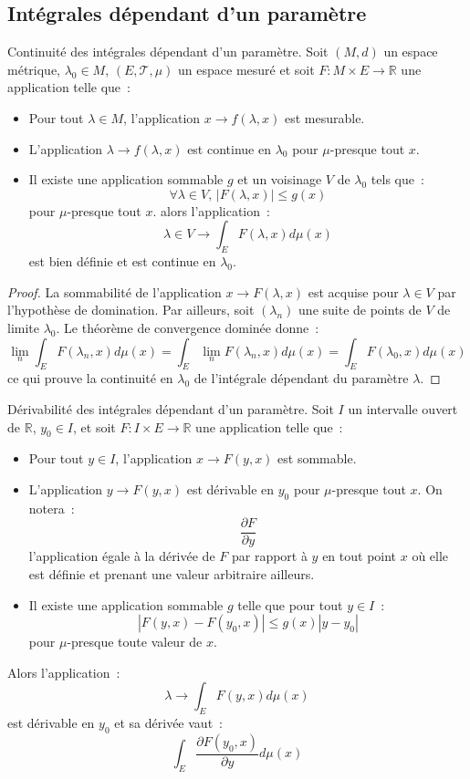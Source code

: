 \subsection{Intégrales dépendant d'un paramètre}
\begin{prop}\label{ch2:contpar} Continuité des intégrales dépendant
  d'un paramètre.
Soit $(M,d)$ un espace métrique, $\lambda_0 \in M$, $(E, \mathcal{T},\mu)$ un espace mesuré et soit $F : M \times E \to
\mathbb{R}$ une application telle que~:
\begin{itemize}
\item Pour tout $\lambda \in M$, l'application $x \to f(\lambda,x)$
  est mesurable.
\item L'application $\lambda \to f(\lambda,x)$ est continue en
  $\lambda_0$ pour $\mu$-presque tout $x$.
\item Il existe une application sommable $g$ et un voisinage $V$ de
  $\lambda_0$ tels que~:
\[
\forall \lambda \in V, \, |F(\lambda,x)| \leq g(x)
\]
pour $\mu$-presque tout $x$.
alors l'application~:
\[
\lambda \in V \to \int_E F(\lambda,x) d\mu(x)
\]
est bien définie et est continue en $\lambda_0$.
\end{itemize}
\end{prop}
\begin{proof}
La sommabilité de l'application $x \to F(\lambda,x)$ est acquise pour
$\lambda \in V$ par l'hypothèse de domination. Par ailleurs, soit
$(\lambda_n)$ une suite de points de $V$ de limite $\lambda_0$. Le
théorème de convergence dominée donne~:
\[
\lim_n \int_E F(\lambda_n,x)d\mu(x) = \int_E \lim_n  F(\lambda_n,x)d\mu(x) =
\int_E F(\lambda_0,x)d\mu(x)
\]
ce qui prouve la continuité en $\lambda_0$ de l'intégrale dépendant du
paramètre $\lambda$.
\end{proof}
\begin{prop}\label{ch2:derpar} Dérivabilité des intégrales dépendant
  d'un paramètre.
Soit $I$ un intervalle ouvert de $\mathbb{R}$, $y_0 \in I$, et soit $F : I \times E \to
\mathbb{R}$ une application telle que~:
\begin{itemize}
\item Pour tout $y \in I$, l'application $x \to F(y,x)$ est sommable.
\item L'application $y \to F(y,x)$ est dérivable en $y_0$ pour $\mu$-presque
  tout $x$. On notera~:
\[
\frac{\partial F}{\partial y}
\]
l'application égale à la dérivée de $F$ par rapport à $y$ en tout
point $x$ où elle est définie et prenant une valeur arbitraire
ailleurs.
\item Il existe une application sommable $g$ telle que pour tout $y
  \in I$~:
\[
|F(y,x)-F(y_0,x)| \leq g(x) |y-y_0|
\]
pour $\mu$-presque toute valeur de $x$.
\end{itemize}
Alors l'application~:
\[
\lambda \to \int_E F(y,x)d\mu(x)
\]
est dérivable en $y_0$ et sa dérivée vaut~:
\[
 \int_E \frac{\partial F(y_0,x)}{\partial y} d \mu(x)
\]
\end{prop}
